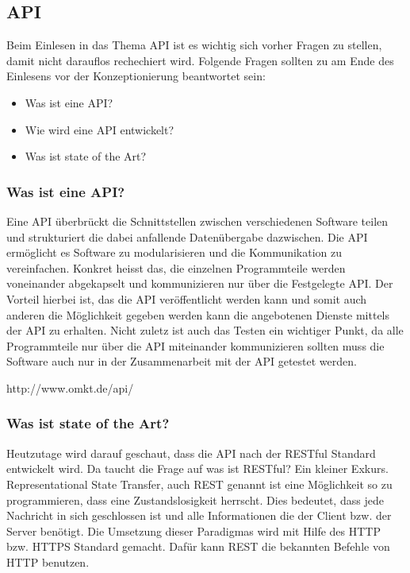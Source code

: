
\subsection{API}
Beim Einlesen in das Thema API ist es wichtig sich vorher Fragen zu stellen, damit nicht darauflos rechechiert wird. Folgende Fragen sollten zu am Ende des Einlesens vor der Konzeptionierung beantwortet sein:
\begin{itemize}
\item Was ist eine API?
\item Wie wird eine API entwickelt?
\item Was ist state of the Art?
\end{itemize}

\subsubsection{Was ist eine API?}
Eine API überbrückt die Schnittstellen zwischen verschiedenen Software teilen und strukturiert die dabei anfallende Datenübergabe dazwischen. Die API ermöglicht es Software zu modularisieren und die Kommunikation zu vereinfachen. Konkret heisst das, die einzelnen Programmteile werden voneinander abgekapselt und kommunizieren nur über die Festgelegte API. Der Vorteil hierbei ist, das die API veröffentlicht werden kann und somit auch anderen die Möglichkeit gegeben werden kann die angebotenen Dienste mittels der API zu erhalten. Nicht zuletz ist auch das Testen ein wichtiger Punkt, da alle Programmteile nur über die API miteinander kommunizieren sollten muss die Software auch nur in der Zusammenarbeit mit der API getestet werden. 

http://www.omkt.de/api/

\subsubsection{Was ist state of the Art?}
Heutzutage wird darauf geschaut, dass die API nach der RESTful Standard entwickelt wird. Da taucht die Frage auf was ist RESTful? Ein kleiner Exkurs. Representational State Transfer, auch REST genannt ist eine Möglichkeit so zu programmieren, dass eine Zustandslosigkeit herrscht. Dies bedeutet, dass jede Nachricht in sich geschlossen ist und alle Informationen die der Client bzw. der Server benötigt. Die Umsetzung dieser Paradigmas wird mit Hilfe des HTTP bzw. HTTPS Standard gemacht. Dafür kann REST die bekannten Befehle von HTTP benutzen.\\

